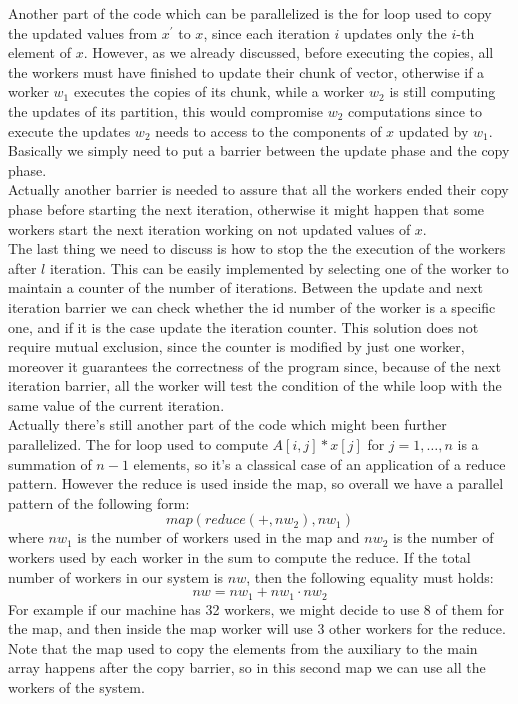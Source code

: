 \documentclass[12pt]{article}
\begin{document}
	Another part of the code which can be parallelized is the for loop used to copy the updated values from $x^\prime$ to $x$, since each iteration $i$ updates only the $i$-th element of $x$. However, as we already discussed, before executing the copies, all the workers must have finished to update their chunk of vector, otherwise if a worker $w_1$ executes the copies of its chunk, while a worker $w_2$ is still computing the updates of its partition, this would compromise $w_2$ computations since to execute the updates $w_2$ needs to access to the components of $x$ updated by $w_1$. Basically we simply need to put a barrier between the update phase and the copy phase.\\
	Actually another barrier is needed to assure that all the workers ended their copy phase before starting the next iteration, otherwise it might happen that some workers start the next iteration working on not updated values of $x$.\\
	The last thing we need to discuss is how to stop the the execution of the workers after $l$ iteration. This can be easily implemented by selecting one of the worker to maintain a counter of the number of iterations. Between the update and next iteration barrier we can check whether the id number of the worker is a specific one, and if it is the case update the iteration counter. This solution does not require mutual exclusion, since the counter is modified by just one worker, moreover it guarantees the correctness of the program since, because of the next iteration barrier, all the worker will test the condition of the while loop with the same value of the current iteration. \\
	Actually there's still another part of the code which might been further parallelized. The for loop used to compute $A[i,j]*x[j]$ for $j=1,\dots, n$ is a summation of $n-1$ elements, so it's a classical case of an application of a reduce pattern. However the reduce is used inside the map, so overall we have a parallel pattern of the following form:
	\[ map(reduce(+, nw_2), nw_1)\]
	where $nw_1$ is the number of workers used in the map and $nw_2$ is the number of workers used by each worker in the sum to compute the reduce. If the total number of workers in our system is $nw$, then the following equality must holds:
	\[ nw = nw_1 + nw_1\cdot nw_2\]
	For example if our machine has 32 workers, we might decide to use 8 of them for the map, and then inside the map worker will use 3 other workers for the reduce. Note that the map used to copy the elements from the auxiliary to the main array happens after the copy barrier, so in this second map we can use all the workers of the system. 
	
\end{document}
